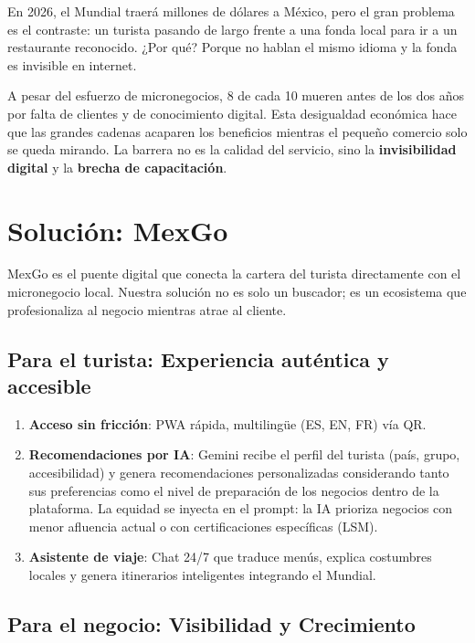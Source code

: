 \documentclass[11pt,a4paper]{article}
\begin{document}
En 2026, el Mundial traerá millones de dólares a México, pero el gran problema es el contraste:
un turista  pasando de largo frente a una fonda local para ir a
un restaurante reconocido. ¿Por qué? Porque no hablan el mismo idioma y la fonda es invisible en internet.

A pesar del esfuerzo de micronegocios, 8 de cada 10 mueren antes de los dos años por
falta de clientes y de conocimiento digital. Esta desigualdad económica hace que las
grandes cadenas acaparen los beneficios mientras el pequeño comercio solo se queda
mirando. La barrera no es la calidad del servicio, sino la \textbf{invisibilidad digital}
y la \textbf{brecha de capacitación}.

\section{Solución: MexGo}

MexGo es el puente digital que conecta la cartera del turista directamente con
el micronegocio local. Nuestra solución no es solo un buscador; es un ecosistema
que profesionaliza al negocio mientras atrae al cliente.

\subsection{Para el turista: Experiencia auténtica y accesible}

\begin{enumerate}[leftmargin=*, itemsep=3pt]
  \item \textbf{Acceso sin fricción}: PWA rápida, multilingüe (ES, EN, FR) vía QR.
  \item \textbf{Recomendaciones por IA}: Gemini recibe el perfil del turista (país,
        grupo, accesibilidad) y genera recomendaciones personalizadas considerando tanto sus preferencias como el nivel de preparación de los negocios dentro de la plataforma.
        La equidad se inyecta en el prompt: la IA prioriza negocios con menor
        afluencia actual o con certificaciones específicas (LSM).
  \item \textbf{Asistente de viaje}: Chat 24/7 que traduce menús, explica
        costumbres locales y genera itinerarios inteligentes integrando
        el Mundial.
\end{enumerate}

\subsection{Para el negocio: Visibilidad y Crecimiento}
\end{document}
